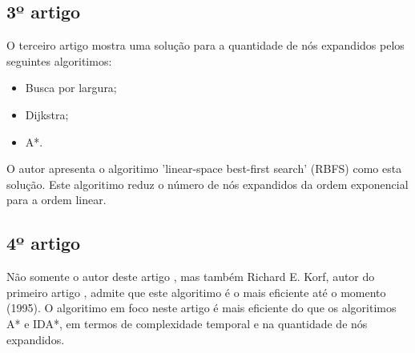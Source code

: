 \documentclass[a4paper]{article}
\begin{document}
\subsection{3º artigo}

O terceiro artigo \cite{Korf1993} mostra uma solução para a quantidade de nós expandidos pelos
seguintes algoritimos:

\begin{itemize}

\item Busca por largura;
\item Dijkstra;
\item A*.

\end{itemize}

O autor apresenta o algoritimo 'linear-space best-first search' (RBFS) como esta solução. Este algoritimo reduz o número de nós expandidos da ordem exponencial para a ordem linear.

\subsection{4º artigo}

Não somente o autor deste artigo \cite{Dillenburg1994}, mas também Richard E. Korf, autor do primeiro artigo \cite{Korf1995}, admite que este algoritimo é o mais eficiente até o momento (1995). O algoritimo em foco neste artigo é mais eficiente do que os algoritimos A* e IDA*, em termos de complexidade temporal e na quantidade de nós expandidos.





\end{document}

